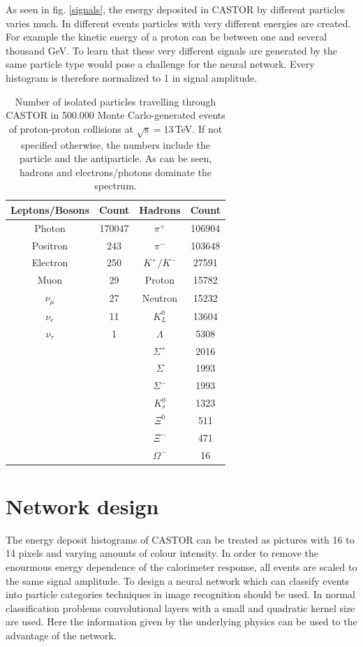 As seen in fig. \ref{signals}, the energy deposited in CASTOR by different particles varies much. In different events particles with very different energies are created. For example the kinetic energy of a proton can be between one and several thousand GeV. To learn that these very different signals are generated by the same particle type would pose a challenge for the neural network. Every histogram is therefore normalized to 1 in signal amplitude. 
\begin{table}
\centering
\caption{Number of isolated particles travelling through CASTOR in 500.000 Monte Carlo-generated events of proton-proton collisions at $\sqrt{\mathrm{s}} = 13\,$TeV. If not specified otherwise, the numbers include the particle and the antiparticle. As can be seen, hadrons and electrons/photons dominate the spectrum.}
\sffamily
\begin{tabular}{cc |cc }
\hline
Leptons/Bosons & Count & Hadrons & Count \\ \hline
Photon & 170047 & $\pi^+$ & 106904 \\
Positron & 243 & $\pi^-$ & 103648 \\
Electron & 250 & $K^+ / K^-$ & 27591 \\
Muon & 29 & Proton & 15782\\
$\nu_{\mu}$ & 27 & Neutron & 15232 \\
$\nu_e$ & 11 & $K^0_L$ & 13604 \\
$\nu_{\tau}$ & 1 &  $\Lambda$ & 5308\\
& & $\Sigma^+$ & 2016 \\
& & $\Sigma$ & 1993 \\
& & $\Sigma^-$ & 1993 \\
& & $K^0_s$ & 1323 \\
& & $\Xi^0$ & 511 \\
& & $\Xi^-$ & 471 \\
& & $\Omega^-$ & 16 \\
 \hline
\end{tabular}
\label{particlecounts}
\end{table}
\section{Network design}
The energy deposit histograms of CASTOR can be treated as pictures with 16 to 14 pixels and varying amounts of colour intensity. In order to remove the enourmous energy dependence of the calorimeter response, all events are scaled to the same signal amplitude. To design a neural network which can classify events into particle categories techniques in image recognition should be used. In normal classification problems convolutional layers with a small and quadratic kernel size are used. Here the information given by the underlying physics can be used to the advantage of the network. 

